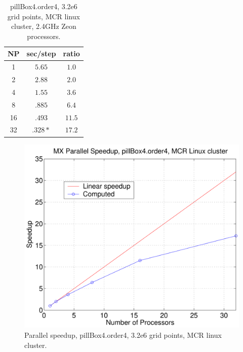 \documentclass[11pt]{article}
\begin{document}
\begin{table}[hbt]
\begin{center}\footnotesize
\begin{tabular}{|c|c|c|} \hline 
     NP       & sec/step   & ratio \\   \hline\hline 
     1        &  $5.65$    & $ 1.0 $   \\ 
     2        &  $2.88$    & $ 2.0 $   \\ 
     4        &  $1.55$    & $ 3.6 $   \\ 
     8        &  $.885$    & $ 6.4 $   \\ 
    16        &  $.493$    & $11.5 $   \\ 
    32        &  $.328*$   & $17.2 $   \\ \hline 
\end{tabular}		
\end{center}		
\caption{pillBox4.order4, 3.2e6 grid points, MCR linux cluster, 2.4GHz Zeon processors.}
 \label{tab:box} 
\end{table}

\begin{figure}
\begin{center}
  \includegraphics[width=.75\linewidth]{figures/speedupMCR-pillBox4-order4}
\end{center}
\caption{Parallel speedup, pillBox4.order4, 3.2e6 grid points, MCR linux cluster.}
\end{figure}
\end{document}
